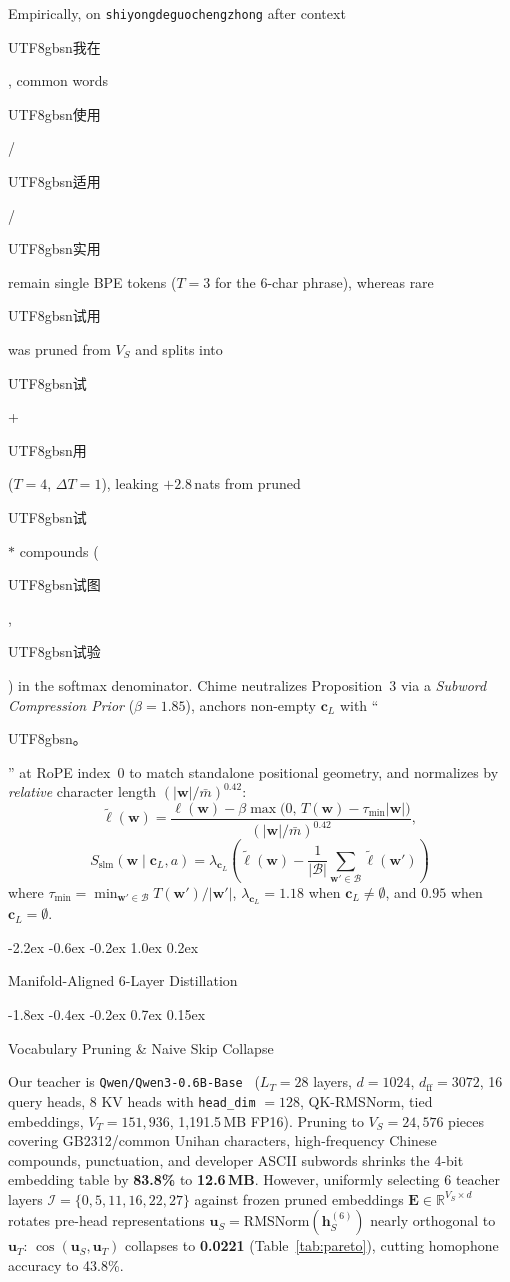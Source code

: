 \documentclass[10pt,twocolumn,letterpaper]{article}
\makeatletter
\newcommand{\zh}[1]{\begin{CJK*}{UTF8}{gbsn}{\small #1}\end{CJK*}}
\newcommand{\zh}[1]{#1}
\renewcommand\section{\@startsection {section}{1}{\z@}%
  {-2.2ex \@plus -0.6ex \@minus -0.2ex}%
  {1.0ex \@plus 0.2ex}%
  {\normalfont\large\bfseries\raggedright}}
\renewcommand\subsection{\@startsection{subsection}{2}{\z@}%
  {-1.8ex \@plus -0.4ex \@minus -0.2ex}%
  {0.7ex \@plus 0.15ex}%
  {\normalfont\normalsize\fontsize{10.8}{13}\selectfont\bfseries\raggedright}}
\makeatother
\begin{document}
Empirically, on \texttt{shiyongdeguochengzhong} after context \zh{我在}, common words \zh{使用}/\zh{适用}/\zh{实用} remain single BPE tokens ($T = 3$ for the 6-char phrase), whereas rare \zh{试用} was pruned from $V_S$ and splits into \zh{试} + \zh{用} ($T = 4$, $\Delta T = 1$), leaking $+2.8$\,nats from pruned \zh{试}$*$ compounds (\zh{试图}, \zh{试验}) in the softmax denominator. Chime neutralizes Proposition~3 via a \emph{Subword Compression Prior} ($\beta = 1.85$), anchors non-empty $\bm{c}_L$ with ``\zh{。}'' at RoPE index~0 to match standalone positional geometry, and normalizes by \emph{relative} character length $(|\bm{w}| / \bar{m})^{0.42}$:
\begin{equation}\label{eq:bpe}
  \tilde{\ell}(\bm{w}) = \frac{\ell(\bm{w}) - \beta \max\!\big(0,\, T(\bm{w}) - \tau_{\min} |\bm{w}|\big)}{(|\bm{w}| / \bar{m})^{0.42}},
\end{equation}
\begin{equation}\label{eq:rerank}
  S_{\text{slm}}(\bm{w} \mid \bm{c}_L, a) = \lambda_{\bm{c}_L} \left( \tilde{\ell}(\bm{w}) - \frac{1}{|\mathcal{B}|} \sum_{\bm{w}' \in \mathcal{B}} \tilde{\ell}(\bm{w}') \right)
\end{equation}
where $\tau_{\min} = \min_{\bm{w}' \in \mathcal{B}} T(\bm{w}') / |\bm{w}'|$, $\lambda_{\bm{c}_L} = 1.18$ when $\bm{c}_L \neq \emptyset$, and $0.95$ when $\bm{c}_L = \emptyset$.

\section{Manifold-Aligned 6-Layer Distillation}\label{sec:distill}

\subsection{Vocabulary Pruning \& Naive Skip Collapse}

Our teacher is \texttt{Qwen/Qwen3-0.6B-Base}~\cite{yang2025qwen3} ($L_T = 28$ layers, $d = 1024$, $d_{\text{ff}} = 3072$, 16 query heads, 8 KV heads with \texttt{head\_dim} $= 128$, QK-RMSNorm, tied embeddings, $V_T = 151{,}936$, 1,191.5\,MB FP16). Pruning to $V_S = 24{,}576$ pieces covering GB2312/common Unihan characters, high-frequency Chinese compounds, punctuation, and developer ASCII subwords shrinks the 4-bit embedding table by \textbf{83.8\%} to \textbf{12.6\,MB}. However, uniformly selecting 6 teacher layers $\mathcal{I} = \{0, 5, 11, 16, 22, 27\}$ against frozen pruned embeddings $\bm{E} \in \mathbb{R}^{V_S \times d}$ rotates pre-head representations $\bm{u}_S = \text{RMSNorm}(\bm{h}_S^{(6)})$ nearly orthogonal to $\bm{u}_T$: $\cos(\bm{u}_S, \bm{u}_T)$ collapses to \textbf{0.0221} (Table~\ref{tab:pareto}), cutting homophone accuracy to 43.8\%.
\end{document}
